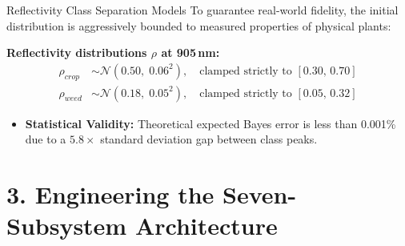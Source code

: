\documentclass[10pt,aspectratio=169]{beamer}
\begin{document}
\begin{frame}{Reflectivity Class Separation Models}
    To guarantee real-world fidelity, the initial distribution is aggressively bounded to measured properties of physical plants:
    
    \vspace{5mm}
    \textbf{Reflectivity distributions $\rho$ at 905\,nm:}
    \begin{align*}
        \rho_{crop} &\sim \mathcal{N}(0.50,\;0.06^2),\quad \text{clamped strictly to } [0.30,\,0.70] \\
        \rho_{weed} &\sim \mathcal{N}(0.18,\;0.05^2),\quad \text{clamped strictly to } [0.05,\,0.32]
    \end{align*}
    
    \vspace{3mm}
    \begin{itemize}
        \item \textbf{Statistical Validity:} Theoretical expected Bayes error is less than 0.001\% due to a $5.8\times$ standard deviation gap between class peaks.
    \end{itemize}
\end{frame}


\section{3. Engineering the Seven-Subsystem Architecture}
\end{document}
